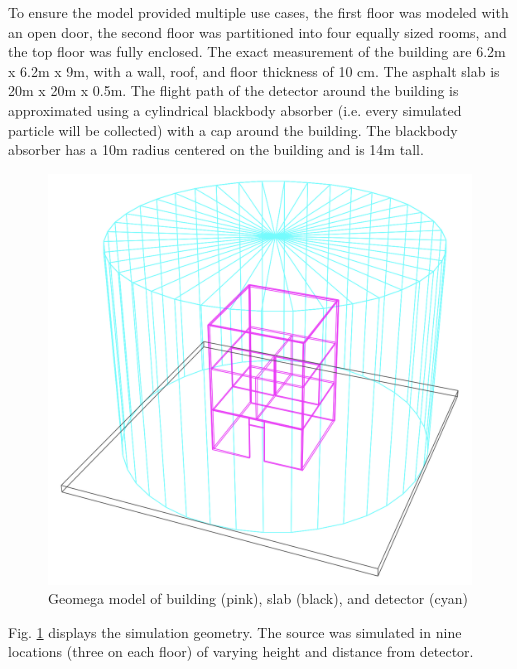 To ensure the model provided multiple use cases, the first floor was modeled with an open door, the second floor was partitioned into four equally sized rooms, and the top floor was fully enclosed. The exact measurement of the building are 6.2m x 6.2m x 9m, with a wall, roof, and floor thickness of 10 cm. The asphalt slab is 20m x 20m x 0.5m. The flight path of the detector around the building is approximated using a cylindrical blackbody absorber (i.e. every simulated particle will be collected) with a cap around the building. The blackbody absorber has a 10m radius centered on the building and is 14m tall.

\begin{figure}[!htb]
  \centering
  \includegraphics[width=\columnwidth]{images/model}
  \caption{Geomega model of building (pink), slab (black), and detector (cyan)}
  \label{fig:model}
\end{figure}

Fig. \ref{fig:model} displays the simulation geometry. The source was simulated in nine locations (three on each floor) of varying height and distance from detector.

